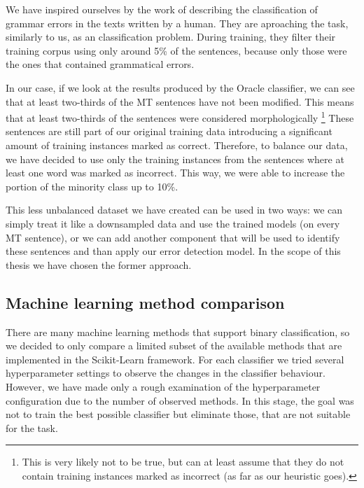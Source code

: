 We have inspired ourselves by the work of \citet{2013_Jia_CoNLL_GrammaticalError} describing the classification of grammar errors in the texts
written by a human. They are aproaching the task, similarly to us, as an classification
problem. During training, they filter their training corpus using only around 5\% of
the sentences, because only those were the ones that contained grammatical errors.

In our case, if we look at the results produced by the Oracle classifier, we can see that at least
two-thirds of the MT sentences have not been modified. This means that at least two-thirds of the sentences
were considered morphologically \footnote{This is very likely not to be true, but can at least assume
that they do not contain training instances marked as incorrect (as far as our heuristic goes).}
These sentences are still part of our original training data introducing a significant amount of training
instances marked as correct.
Therefore, to balance our data, we have decided to use only the training
instances from the sentences where at least one word was marked as incorrect. This way, we were
able to increase the portion of the minority class up to 10\%.

This less unbalanced dataset we have created can be used in two ways: we can simply treat
it like a downsampled data and use the trained models  (on every MT sentence),
or we can add another component that will be used to identify these  sentences
and than apply our error detection model. In the scope of this thesis we have chosen the former
approach.



\subsection{Machine learning method comparison}

There are many machine learning methods that support binary classification, so we
decided to only compare a limited subset of the available methods that are implemented
in the Scikit-Learn framework. For each classifier we tried several hyperparameter
settings to observe the changes in the classifier behaviour. However, we have made only
a rough examination of the hyperparameter configuration due to the number of observed
methods. In this stage, the goal was not to train the best possible classifier but
eliminate those, that are not suitable for the task.

